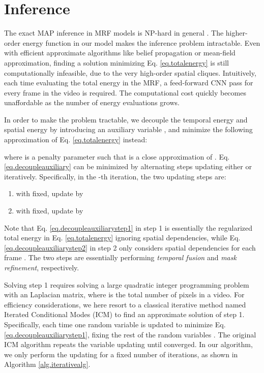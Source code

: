 \documentclass[10pt,twocolumn,letterpaper]{article}
\begin{document}
\section{Inference}\label{sec.ourinference}

The exact MAP inference in MRF models is NP-hard in general \cite{koller2009probabilistic}.
The higher-order energy function in our model makes the inference problem intractable.
Even with efficient approximate algorithms like belief propagation or mean-field approximation,
finding a solution minimizing Eq. \eqref{eq.totalenergy} is still computationally infeasible,
due to the very high-order spatial cliques.
Intuitively, each time evaluating the total energy in the MRF, a feed-forward CNN pass for every frame in the video is required.
The computational cost quickly becomes unaffordable as the number of energy evaluations grows.

In order to make the problem tractable, we decouple the temporal energy  and spatial energy 
by introducing an auxiliary variable ,
and minimize the following approximation of Eq. \eqref{eq.totalenergy} instead:

where  is a penalty parameter such that  is a close approximation of .
Eq. \eqref{eq.decoupleauxiliary} can be minimized by alternating steps updating either  or  iteratively.
Specifically, in the -th iteration, the two updating steps are:
\begin{enumerate}
  \setlength{\itemsep}{0pt}
  \setlength{\parskip}{0pt}
  \item with  fixed, update  by
  
  \item with  fixed, update  by
  
\end{enumerate}
Note that Eq. \eqref{eq.decoupleauxiliarystep1} in step 1 is essentially the regularized total energy
in Eq. \eqref{eq.totalenergy} ignoring spatial dependencies,
while Eq. \eqref{eq.decoupleauxiliarystep2} in step 2 only considers spatial dependencies for each frame .
The two steps are essentially performing \emph{temporal fusion} and \emph{mask refinement}, respectively.








Solving step 1 requires solving a large quadratic integer programming problem with an  Laplacian matrix,
where  is the total number of pixels in a video.
For efficiency considerations, we here resort to a classical iterative method named
Iterated Conditional Modes (ICM) \cite{bishop2006pattern} to find an approximate solution of step 1.
Specifically, each time one random variable  is updated to minimize Eq. \eqref{eq.decoupleauxiliarystep1},
fixing the rest of the random variables .
The original ICM algorithm repeats the variable updating until converged.
In our algorithm, we only perform the updating for a fixed number  of iterations, as shown in Algorithm \ref{alg.iterativealg}.
\end{document}
